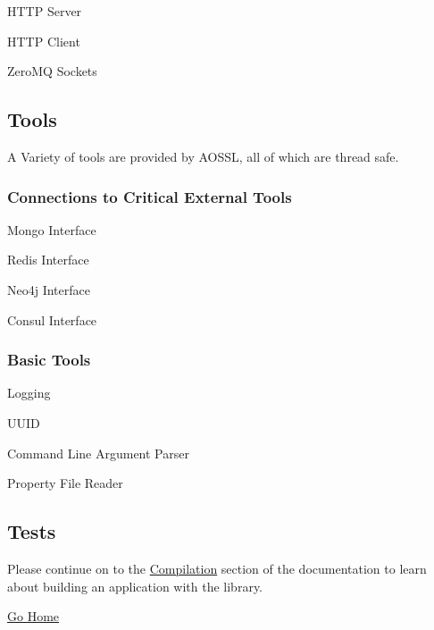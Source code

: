 \begin{DoxyItemize}
\item H\+T\+TP Server
\item H\+T\+TP Client
\item Zero\+MQ Sockets
\end{DoxyItemize}

\subsection*{Tools}

A Variety of tools are provided by A\+O\+S\+SL, all of which are thread safe.

\subsubsection*{Connections to Critical External Tools}


\begin{DoxyItemize}
\item Mongo Interface
\item Redis Interface
\item Neo4j Interface
\item Consul Interface
\end{DoxyItemize}

\subsubsection*{Basic Tools}


\begin{DoxyItemize}
\item Logging
\item U\+U\+ID
\item Command Line Argument Parser
\item Property File Reader
\end{DoxyItemize}

\subsection*{Tests}

Please continue on to the \hyperlink{compilation}{Compilation} section of the documentation to learn about building an application with the library.

\hyperlink{index}{Go Home} 